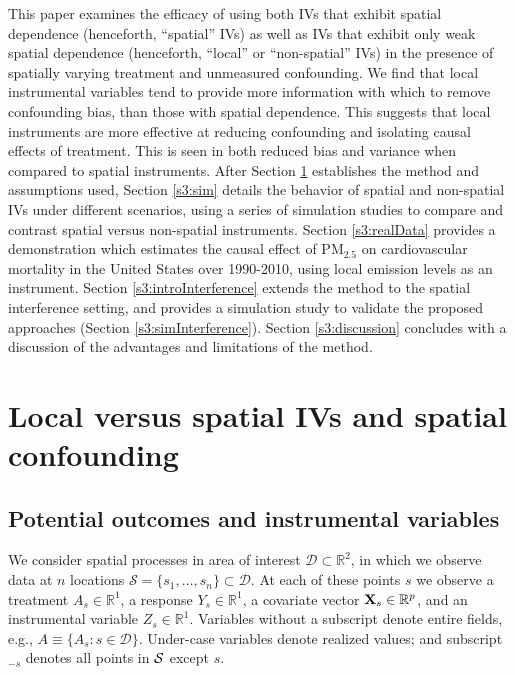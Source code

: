 \documentclass[12pt]{article}
\begin{document}
This paper examines the efficacy of using both IVs that exhibit spatial dependence (henceforth, ``spatial'' IVs) as well as IVs that exhibit only weak spatial dependence (henceforth, ``local'' or ``non-spatial'' IVs) in the presence of spatially varying treatment and unmeasured confounding. We find that local instrumental variables tend to provide more information with which to remove confounding bias, than those with spatial dependence. This suggests that local instruments are more effective at reducing confounding and isolating causal effects of treatment. This is seen in both reduced bias and variance when compared to spatial instruments. After Section \ref{s3:prelims} establishes the method and assumptions used, Section \ref{s3:sim} details the behavior of spatial and non-spatial IVs under different scenarios, using a series of simulation studies to compare and contrast spatial versus non-spatial instruments. Section \ref{s3:realData} provides a demonstration which estimates the causal effect of PM$_{2.5}$ on cardiovascular mortality in the United States over 1990-2010, using local emission levels as an instrument. Section \ref{s3:introInterference} extends the method to the spatial interference setting, and provides a simulation study to validate the proposed approaches (Section \ref{s3:simInterference}). Section \ref{s3:discussion} concludes with a discussion of the advantages and limitations of the method.



\section{Local versus spatial IVs and spatial confounding}\label{s3:prelims}

\subsection{Potential outcomes and instrumental variables}

We consider spatial processes in area of interest $\mathcal{D} \subset \mathbb{R}^2$, in which we observe data at $n$ locations $\mathcal{S} = \{s_1, \ldots, s_n\} \subset \mathcal{D}$.  At each of these points $s$ we observe a treatment $A_s \in \mathbb{R}^1$, a response $Y_s \in \mathbb{R}^1$, a covariate vector $\mathbf{X}_s \in \mathbb{R}^p$, and an instrumental variable $Z_s \in \mathbb{R}^1$. Variables without a subscript denote entire fields, e.g., $A \equiv \{ A_s: s \in \mathcal{D}\}$. Under-case variables denote realized values; and subscript $_{-s}$ denotes all points in $\cal S$ except $s$.
\end{document}
